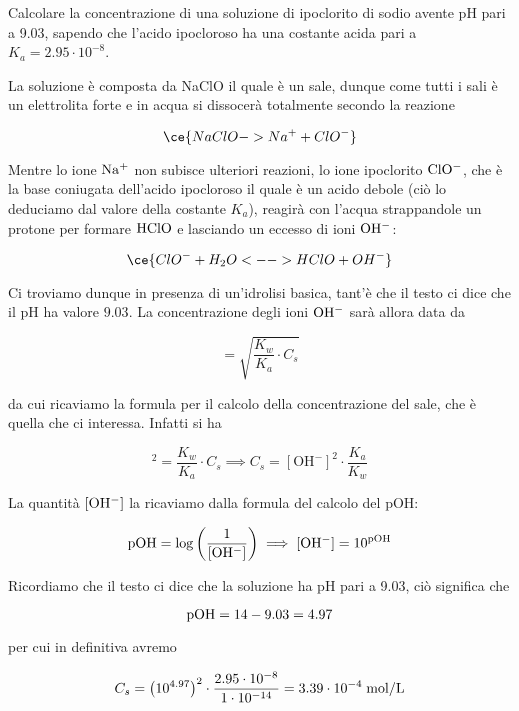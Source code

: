 \begin{esercizio}
    Calcolare la concentrazione di una soluzione di ipoclorito di sodio avente pH pari a 9.03, sapendo che l'acido ipocloroso ha una costante acida pari a $K_a=2.95 \cdot 10^{-8}$.
\end{esercizio}
\begin{soluzione}
    La soluzione è composta da NaClO il quale è un sale, dunque come tutti i sali è un elettrolita forte e in acqua si dissocerà totalmente secondo la reazione

\begin{equation*}
    \ce{NaClO -> Na^+ + ClO^-}
\end{equation*}

Mentre lo ione $\rm Na^+$ non subisce ulteriori reazioni, lo ione ipoclorito $\rm ClO^-$, che è la base coniugata dell'acido ipocloroso il quale è un acido debole (ciò lo deduciamo dal valore della costante $K_a$), reagirà con l'acqua strappandole un protone per formare $\rm HClO$ e lasciando un eccesso di ioni $\rm OH^-$:

\begin{equation*}
    \ce{ClO^- + H_2O <--> HClO + OH^-}
\end{equation*}

Ci troviamo dunque in presenza di un'idrolisi basica, tant'è che il testo ci dice che il pH ha valore $9.03$. La concentrazione degli ioni $\rm OH^-$ sarà allora data da

\begin{equation*}
    [\text{OH}^-]
    =\sqrt{\frac{K_w}{K_a}\cdot C_s}
\end{equation*}

da cui ricaviamo la formula per il calcolo della concentrazione del sale, che è quella che ci interessa. Infatti si ha

\begin{equation*}
    [\text{OH}^-]^2
    =\frac{K_w}{K_a}\cdot C_s
    \implies
    C_s
    =[\text{OH}^-]^2 \cdot \frac{K_a}{K_w}
\end{equation*}

La quantità $\rm [OH^-]$ la ricaviamo dalla formula del calcolo del pOH:

\begin{equation*}
    \rm pOH=\log \left( \frac{1}{[OH^-]} \right)
    \implies
    [OH^-]=10^{pOH}
\end{equation*}

Ricordiamo che il testo ci dice che la soluzione ha pH pari a 9.03, ciò significa che

\begin{equation*}
    \rm pOH=14-9.03=4.97
\end{equation*}

per cui in definitiva avremo

\begin{equation*}
    C_s
    ={\big( 10^{4.97} \big)}^2 \cdot \frac{2.95 \cdot 10^{-8}}{1 \cdot 10^{-14}}
    =3.39 \cdot 10^{-4} \; \rm mol/L
\end{equation*}
\end{soluzione}